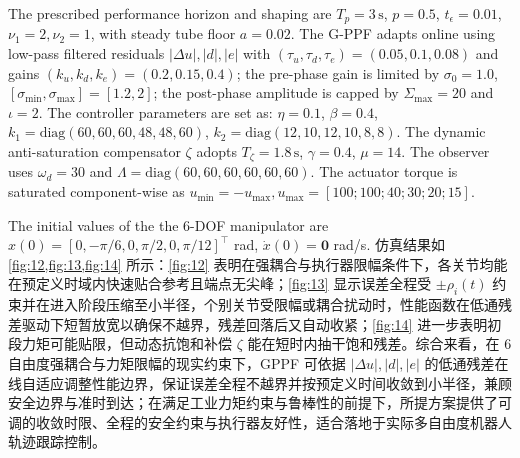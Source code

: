 \documentclass[pdflatex,sn-mathphys-num]{sn-jnl}%
\theoremstyle{thmstyleone}%
\theoremstyle{thmstyletwo}%
\theoremstyle{thmstylethree}%
\begin{document}
The prescribed performance horizon and shaping are \(T_p=3\,\mathrm{s}\), \(p=0.5\), $t_\epsilon=0.01$, $\nu_1=2, \nu_2=1$, with steady tube floor \(a=0.02\). 
The G-PPF adapts online using low-pass filtered residuals \(|\Delta u|,|d|,|e|\) with \((\tau_u,\tau_d,\tau_e)=(0.05,0.1,0.08)\) and gains \((k_u,k_d,k_e)=(0.2,0.15,0.4)\); the pre-phase gain is limited by \(\sigma_0=1.0\), \([\sigma_{\min},\sigma_{\max}]=[1.2,2]\); the post-phase amplitude is capped by \(\Sigma_{\max}=20\) and \(\iota=2\).
The controller parameters are set as: \(\eta=0.1\), \(\beta=0.4\), \(k_1=\mathrm{diag}( 60, 60, 60, 48, 48, 60)\), \(k_2=\mathrm{diag}(12, 10, 12, 10, 8, 8)\).
The dynamic anti-saturation compensator \(\zeta\) adopts \(T_\zeta=1.8\,\mathrm{s}\), \(\gamma=0.4\), \(\mu=14\).
The observer uses \(\omega_d=30\) and \(\Lambda=\mathrm{diag}(60,60,60,60,60,60)\).
The actuator torque is saturated component-wise as $u_{\min}=-u_{\max}, u_{\max}=[100; 100; 40; 30; 20; 15]$.

The initial values of the the 6-DOF manipulator are ${x}(0)=[0, -{\pi}/{6},0, {\pi}/{2},0,{\pi}/{12}]^{\top}$ rad, $\dot{x}(0)=\mathbf{0}$ rad/s. 仿真结果如 \cref{fig:12,fig:13,fig:14} 所示：\cref{fig:12} 表明在强耦合与执行器限幅条件下，各关节均能在预定义时域内快速贴合参考且端点无尖峰；\cref{fig:13} 显示误差全程受 \(\pm\rho_i(t)\) 约束并在进入阶段压缩至小半径，个别关节受限幅或耦合扰动时，性能函数在低通残差驱动下短暂放宽以确保不越界，残差回落后又自动收紧；\cref{fig:14} 进一步表明初段力矩可能贴限，但动态抗饱和补偿 \(\zeta\) 能在短时内抽干饱和残差。综合来看，在 6 自由度强耦合与力矩限幅的现实约束下，GPPF 可依据 \(|\Delta u|,|d|,|e|\) 的低通残差在线自适应调整性能边界，保证误差全程不越界并按预定义时间收敛到小半径，兼顾安全边界与准时到达；在满足工业力矩约束与鲁棒性的前提下，所提方案提供了可调的收敛时限、全程的安全约束与执行器友好性，适合落地于实际多自由度机器人轨迹跟踪控制。


\end{document}
